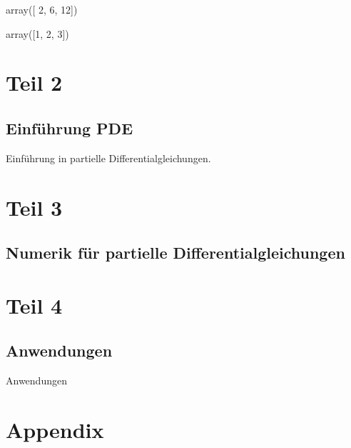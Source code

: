 \documentclass[letterpaper,10pt,english]{jupyterBook}
\begin{document}
\begin{sphinxVerbatim}[commandchars=\\\{\}]
array([ 2,  6, 12])
\end{sphinxVerbatim}

\begin{sphinxVerbatim}[commandchars=\\\{\}]
\end{sphinxVerbatim}

\begin{sphinxVerbatim}[commandchars=\\\{\}]
array([1, 2, 3])
\end{sphinxVerbatim}


\part{Teil 2}


\chapter{Einführung PDE}
\label{\detokenize{PDE/IntroPDE:einfuhrung-pde}}\label{\detokenize{PDE/IntroPDE::doc}}
Einführung in partielle Differentialgleichungen.


\part{Teil 3}


\chapter{Numerik für partielle Differentialgleichungen}
\label{\detokenize{NumerikPDE/NumerikPDE:numerik-fur-partielle-differentialgleichungen}}\label{\detokenize{NumerikPDE/NumerikPDE::doc}}

\part{Teil 4}


\chapter{Anwendungen}
\label{\detokenize{Applications/Applications:anwendungen}}\label{\detokenize{Applications/Applications::doc}}
Anwendungen


\part{Appendix}
\end{document}
